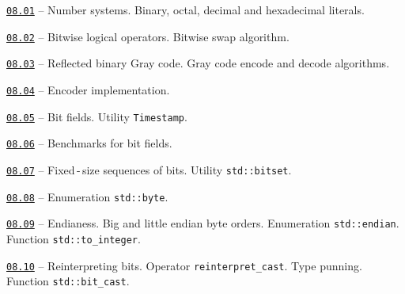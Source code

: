 \documentclass[a4paper,12pt]{article}
\renewenvironment{itemize}
{
    \begin{list}{\labelitemi}
    {
      \setlength{\topsep}{0pt}
      \setlength{\partopsep}{0pt}
      \setlength{\parskip}{0pt}
      \setlength{\itemsep}{0pt}
      \setlength{\parsep}{0pt}
      \setlength{\leftmargin}{14.5pt}
    }
}{\end{list}}
\begin{document}
\begin{itemize}

    \item \href{https://github.com/i-s-m-mipt/Education/blob/master/projects/examples/source/08.01.cpp}{\texttt{08.01}} -- Number systems. Binary, octal, decimal and hexadecimal literals.

    \smallskip

    \item \href{https://github.com/i-s-m-mipt/Education/blob/master/projects/examples/source/08.02.cpp}{\texttt{08.02}} -- Bitwise logical operators. Bitwise swap algorithm.

    \smallskip

    \item \href{https://github.com/i-s-m-mipt/Education/blob/master/projects/examples/source/08.03.cpp}{\texttt{08.03}} -- Reflected binary Gray code. Gray code encode and decode algorithms.

    \smallskip

    \item \href{https://github.com/i-s-m-mipt/Education/blob/master/projects/examples/source/08.04.pdf}{\texttt{08.04}} -- Encoder implementation.

    \smallskip

    \item \href{https://github.com/i-s-m-mipt/Education/blob/master/projects/examples/source/08.05.cpp}{\texttt{08.05}} -- Bit fields. Utility \lstinline{Timestamp}.

    \smallskip

    \item \href{https://github.com/i-s-m-mipt/Education/blob/master/projects/examples/source/08.06.cpp}{\texttt{08.06}} -- Benchmarks for bit fields.

    \smallskip

    \item \href{https://github.com/i-s-m-mipt/Education/blob/master/projects/examples/source/08.07.cpp}{\texttt{08.07}} -- Fixed\,-\,size sequences of bits. Utility \lstinline{std::bitset}.

    \smallskip

    \item \href{https://github.com/i-s-m-mipt/Education/blob/master/projects/examples/source/08.08.cpp}{\texttt{08.08}} -- Enumeration \lstinline{std::byte}.

    \smallskip

    \item \href{https://github.com/i-s-m-mipt/Education/blob/master/projects/examples/source/08.09.cpp}{\texttt{08.09}} -- Endianess. Big and little endian byte orders. Enumeration \lstinline{std::endian}. Function \lstinline{std::to_integer}.

    \smallskip

    \item \href{https://github.com/i-s-m-mipt/Education/blob/master/projects/examples/source/08.10.cpp}{\texttt{08.10}} -- Reinterpreting bits. Operator \lstinline{reinterpret_cast}. Type punning. Function \lstinline{std::bit_cast}.

\end{itemize}
\end{document}
